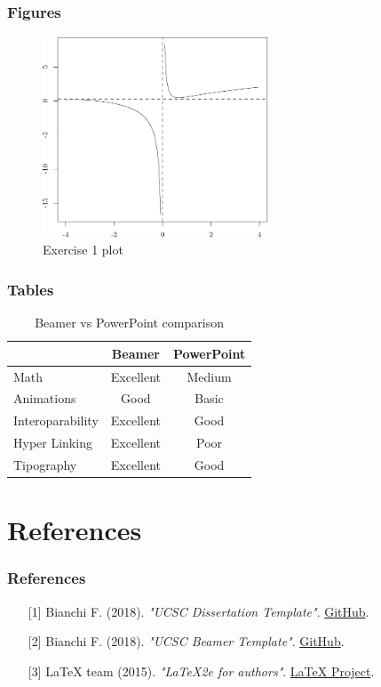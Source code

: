 \documentclass[11pt, xcolor=dvipsnames]{beamer}
\begin{document}
\begin{frame}
\frametitle{Figures}
\bigskip
\begin{figure}
\centering
\includegraphics[width=0.6\textwidth]{Figure_1.pdf}
\caption{Exercise 1 plot}
\label{Exercise-1}	
\end{figure}
\end{frame}

\begin{frame}
\frametitle{Tables}	
\begin{table}[]
\centering
\caption{Beamer vs PowerPoint comparison}
\label{my-label}
\begin{tabular}{@{}lcc@{}}
\toprule
\textbf{} & \textbf{Beamer} & \textbf{PowerPoint} \\ \midrule
Math & Excellent & Medium \\
Animations & Good & Basic \\
Interoparability & Excellent & Good \\
Hyper Linking & \multicolumn{1}{l}{Excellent} & Poor \\
Tipography & \multicolumn{1}{l}{Excellent} & Good \\ \bottomrule
\end{tabular}
\end{table}
\end{frame}

\section{References}

\begin{frame}
\frametitle{References}
\small
\begin{enumerate}
\item[{[1]}] Bianchi F. (2018). \textit{"UCSC Dissertation Template"}. \href{https://github.com/Francesco-Bianchi/UCSC_dissertation_template}{GitHub}.
\item[{[2]}] Bianchi F. (2018). \textit{"UCSC Beamer Template"}. \href{https://github.com/Francesco-Bianchi/UCSC_beamer_template}{GitHub}.
\item[{[3]}] LaTeX team (2015). \textit{"LaTeX2e for authors"}. \href{https://www.latex-project.org/help/documentation/usrguide.pdf}{LaTeX Project}.
\end{enumerate}
\end{frame}
\end{document}
